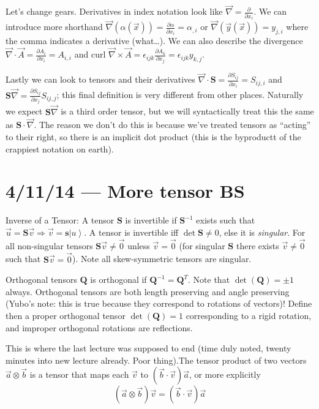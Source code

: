 \documentclass[10pt]{report}
\newcommand{\ket}[1]{\left|#1\right>}
\newcommand{\pd}[2]{\frac{\partial #1}{\partial#2}}
\begin{document}
Let's change gears. Derivatives in index notation look like $\vec{\nabla} = \pd{}{x_i}$. We can introduce more shorthand $\vec{\nabla}(\alpha(\vec{x})) = \pd{\alpha}{x_i} = \alpha_{,i}$ or $\vec{\nabla}(\vec{y}(\vec{x})) = y_{j,i}$ where the comma indicates a derivative (what\dots). We can also describe the divergence $\vec{\nabla}\cdot \vec{A} = \pd{A_i}{x_i} = A_{i,i}$ and curl $\vec{\nabla}\times \vec{A} = \epsilon_{ijk}\pd{A_k}{x_j} = \epsilon_{ijk}y_{k,j}$.

Lastly we can look to tensors and their derivatives $\vec{\nabla} \cdot \mathbf{S} = \pd{S_{ij}}{x_i} = S_{ij,i}$ and $\mathbf{S}\vec{\nabla} = \pd{S_{ij}}{x_j}S_{ij,j}$; this final definition is very different from other places. Naturally we expect $\mathbf{S}\vec{\nabla}$ is a third order tensor, but we will syntactically treat this the same as $\mathbf{S} \cdot \vec{\nabla}$. The reason we don't do this is because we've treated tensors as ``acting'' to their right, so there is an implicit dot product (this is the byproductt of the crappiest notation on earth). 
\chapter{4/11/14 --- More tensor BS}

Inverse of a Tensor: A tensor $\mathbf{S}$ is invertible if $\mathbf{S}^{-1}$ exists such that $\vec{u} = \mathbf{S}\vec{v} \Rightarrow \vec{v} = \mathbf{s}\ket{u}$. A tensor is invertible iff $\det \mathbf{S} \neq 0$, else it is \emph{singular}. For all non-singular tensors $\mathbf{S} \vec{v} \neq \vec{0}$ unless $\vec{v} = \vec{0}$ (for singular $\mathbf{S}$ there exists $\vec{v} \neq \vec{0}$ such that $\mathbf{S}\vec{v} = \vec{0}$). Note all skew-symmetric tensors are singular. 

Orthogonal tensors $\mathbf{Q}$ is orthogonal if $\mathbf{Q}^{-1} = \mathbf{Q}^T$. Note that $\det(\mathbf{Q}) = \pm 1$ always. Orthogonal tensors are both length preserving and angle preserving (Yubo's note: this is true because they correspond to rotations of vectors)! Define then a proper orthogonal tensor $\det(\mathbf{Q}) = 1$ corresponding to a rigid rotation, and improper orthogonal rotations are reflections. 

This is where the last lecture was supposed to end (time duly noted, twenty minutes into new lecture already. Poor thing).The tensor product of two vectors $\vec{a}\otimes \vec{b}$ is a tensor that maps each $\vec{v}$ to $\left( \vec{b}\cdot\vec{v} \right)\vec{a}$, or more explicitly
\begin{equation}
    (\vec{a}\otimes \vec{b})\vec{v} = (\vec{b}\cdot \vec{v})\vec{a}
\end{equation}
\end{document}
